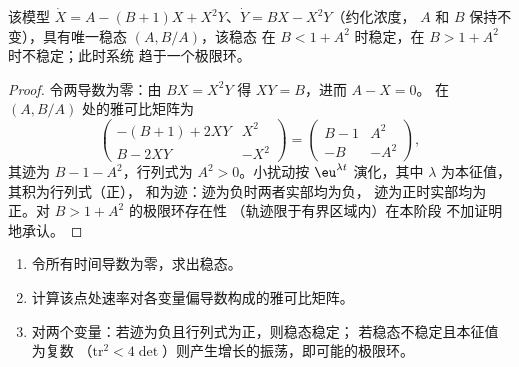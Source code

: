 \begin{proposition}[布鲁塞尔振子的失稳]\label{prop:b3:complex-kinetics:hopf}
该模型 $\dot X = A - (B + 1)X + X^2Y$、$\dot Y = BX - X^2Y$（约化浓度，
$A$ 和 $B$ 保持不变），具有唯一稳态 $(A, B/A)$，该稳态
在 $B < 1 + A^2$ 时稳定，在 $B > 1 + A^2$ 时不稳定；此时系统
趋于一个极限环。
\end{proposition}

\begin{proof}
令两导数为零：由 $BX = X^2Y$ 得 $XY = B$，进而 $A - X = 0$。
在 $(A, B/A)$ 处的雅可比矩阵为
\[
  \begin{pmatrix} -(B + 1) + 2XY & X^2 \\ B - 2XY & -X^2 \end{pmatrix}
  = \begin{pmatrix} B - 1 & A^2 \\ -B & -A^2 \end{pmatrix},
\]
其迹为 $B - 1 - A^2$，行列式为 $A^2 > 0$。小扰动按
$\eu^{\lambda t}$ 演化，其中 $\lambda$ 为本征值，其积为行列式（正），
和为迹：迹为负时两者实部均为负，
迹为正时实部均为正。对 $B > 1 + A^2$ 的极限环存在性
（轨迹限于有界区域内）在本阶段
不加证明地承认。
\end{proof}

\begin{method}[稳态的线性稳定性]\label{met:b3:complex-kinetics:stability}
\begin{enumerate}
  \item 令所有时间导数为零，求出稳态。
  \item 计算该点处速率对各变量偏导数构成的雅可比矩阵。
  \item 对两个变量：若迹为负且行列式为正，则稳态稳定；
        若稳态不稳定且本征值为复数
        （$\mathrm{tr}^2 < 4\det$）则产生增长的振荡，即可能的极限环。
\end{enumerate}
\end{method}

